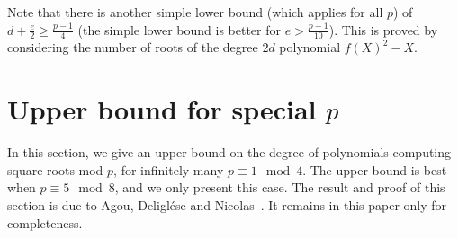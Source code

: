 \documentclass{article}
\begin{document}
Note that there is another simple lower bound (which applies for all $p$) of $d + \frac{e}{2} \geq \frac{p-1}{4}$ (the simple lower bound is better for $e > \frac{p-1}{10}$).
This is proved by considering the number of roots of the degree $2d$ polynomial $f(X)^2 - X$.



\section{Upper bound for special $p$}

In this section, we give an upper bound on the degree of polynomials computing square roots mod $p$, for infinitely many $p \equiv 1 \mod 4$. The upper bound is best when $p \equiv 5 \mod 8$, and we only present this case. The result and proof of this section is due to Agou, Deligl{\'e}se and Nicolas~\cite{ADN-sqrt}. It remains in this paper only for completeness.
\end{document}
